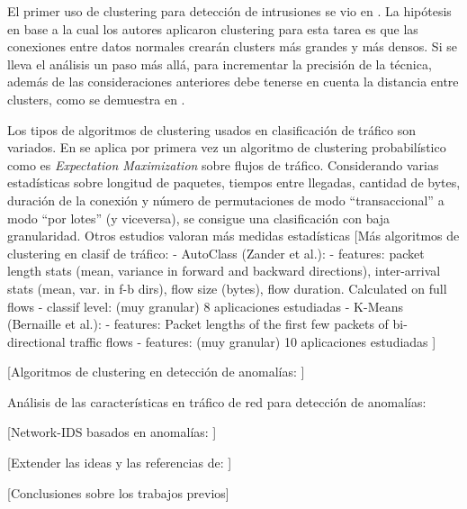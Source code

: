 El primer uso de clustering para detección de intrusiones se vio en \cite{Portnoy_2000}.
La hipótesis en base a la cual los autores aplicaron clustering para esta tarea es que las conexiones entre datos normales crearán clusters más grandes y más densos.
Si se lleva el análisis un paso más allá, para incrementar la precisión de la técnica, además de las consideraciones anteriores debe tenerse en cuenta la distancia entre clusters, como se demuestra en \cite{JSW+06}.

Los tipos de algoritmos de clustering usados en clasificación de tráfico son variados.
En \cite{MHL+04} se aplica por primera vez un algoritmo de clustering probabilístico como es \emph{Expectation Maximization} sobre flujos de tráfico.
Considerando varias estadísticas sobre longitud de paquetes, tiempos entre llegadas, cantidad de bytes, duración de la conexión y número de permutaciones de modo ``transaccional'' a modo ``por lotes'' (y viceversa),
se consigue una clasificación con baja granularidad.
Otros estudios valoran más medidas estadísticas
[Más algoritmos de clustering en clasif de tráfico:
- AutoClass (Zander et al.):
    - features: packet length stats (mean, variance in forward and backward directions), inter-arrival stats (mean, var. in f-b dirs), flow size (bytes), flow duration. Calculated on full flows
    - classif level: (muy granular) 8 aplicaciones estudiadas
- K-Means (Bernaille et al.):
    - features: Packet lengths of the first few packets of bi-directional traffic flows
    - features: (muy granular) 10 aplicaciones estudiadas
]

[Algoritmos de clustering en detección de anomalías:
\cite{SPW12} %
\cite{Leung_2005} %
\cite{Kim_2018} %
]

Análisis de las características en tráfico de red para detección de anomalías:
\cite{Iglesias2015} %

[Network-IDS basados en anomalías:
\cite{GarciaTeodoro_2009} %
\cite{Bhuyan_2014} %
]

[Extender las ideas y las referencias de:
\cite{Bohara_2016} %
]

[Conclusiones sobre los trabajos previos]
